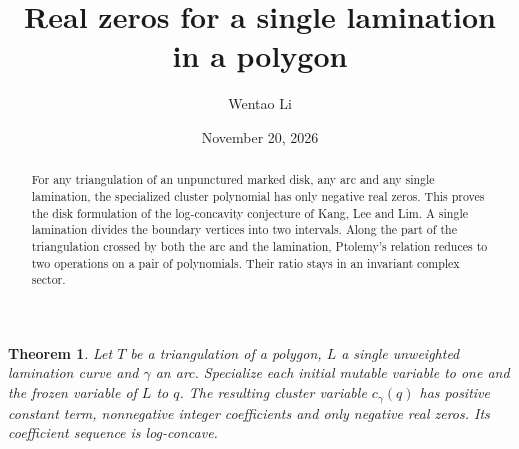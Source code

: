\documentclass[11pt]{article}
\title{Real zeros for a single lamination in a polygon}
\author{Wentao Li}
\date{November 20, 2026}
\newtheorem{theorem}{Theorem}
\begin{document}
\maketitle
\begin{abstract}
For any triangulation of an unpunctured marked disk, any arc and any single
lamination, the specialized cluster polynomial has only negative real zeros.
This proves the disk formulation of the log-concavity conjecture of Kang,
Lee and Lim. A single lamination divides the boundary vertices into two
intervals. Along the part of the triangulation crossed by both the arc and
the lamination, Ptolemy's relation reduces to two operations on a pair of
polynomials. Their ratio stays in an invariant complex sector.
\end{abstract}

\begin{theorem}
Let $T$ be a triangulation of a polygon, $L$ a single unweighted lamination
curve and $\gamma$ an arc. Specialize each initial mutable variable to one
and the frozen variable of $L$ to $q$. The resulting cluster variable
$c_\gamma(q)$ has positive constant term, nonnegative integer coefficients
and only negative real zeros. Its coefficient sequence is log-concave.
\end{theorem}
\end{document}
